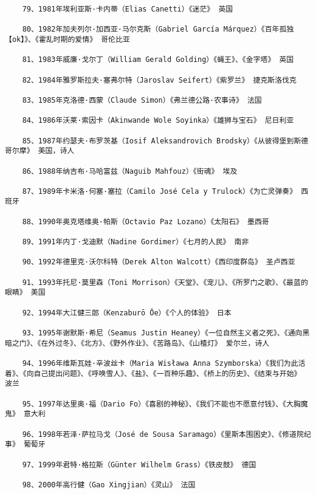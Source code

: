 \documentclass[UTF8]{../RepresentationUniverse}
\begin{document}
\begin{lstlisting}
    79、1981年埃利亚斯·卡内蒂（Elias Canetti）《迷茫》 英国
    
    80、1982年加夫列尔·加西亚·马尔克斯（Gabriel García Márquez）《百年孤独【ok】》、《霍乱时期的爱情》 哥伦比亚
    
    81、1983年威廉·戈尔丁（William Gerald Golding）《蝇王》、《金字塔》 英国
    
    82、1984年雅罗斯拉夫·塞弗尔特（Jaroslav Seifert）《紫罗兰》 捷克斯洛伐克
    
    83、1985年克洛德·西蒙（Claude Simon）《弗兰德公路·农事诗》 法国
    
    84、1986年沃莱·索因卡（Akinwande Wole Soyinka）《雄狮与宝石》 尼日利亚
    
    85、1987年约瑟夫·布罗茨基（Iosif Aleksandrovich Brodsky）《从彼得堡到斯德哥尔摩》 美国，诗人
    
    86、1988年纳吉布·马哈富兹（Naguib Mahfouz）《街魂》 埃及
    
    87、1989年卡米洛·何塞·塞拉（Camilo José Cela y Trulock）《为亡灵弹奏》 西班牙
    
    88、1990年奥克塔维奥·帕斯（Octavio Paz Lozano）《太阳石》 墨西哥
    
    89、1991年内丁·戈迪默（Nadine Gordimer）《七月的人民》 南非
    
    90、1992年德里克·沃尔科特（Derek Alton Walcott）《西印度群岛》 圣卢西亚
    
    91、1993年托尼·莫里森（Toni Morrison）《天堂》、《宠儿》、《所罗门之歌》、《最蓝的眼睛》 美国
    
    92、1994年大江健三郎（Kenzaburō Ōe）《个人的体验》 日本
    
    93、1995年谢默斯·希尼（Seamus Justin Heaney）《一位自然主义者之死》、《通向黑暗之门》、《在外过冬》、《北方》、《野外作业》、《苦路岛》、《山楂灯》 爱尔兰，诗人
    
    94、1996年维斯瓦娃·辛波丝卡（Maria Wisława Anna Szymborska）《我们为此活着》、《向自己提出问题》、《呼唤雪人》、《盐》、《一百种乐趣》、《桥上的历史》、《结束与开始》 波兰
    
    95、1997年达里奥·福（Dario Fo）《喜剧的神秘》、《我们不能也不愿意付钱》、《大胸魔鬼》 意大利
    
    96、1998年若泽·萨拉马戈（José de Sousa Saramago）《里斯本围困史》、《修道院纪事》 葡萄牙
    
    97、1999年君特·格拉斯（Günter Wilhelm Grass）《铁皮鼓》 德国
    
    98、2000年高行健（Gao Xingjian）《灵山》 法国
    

\end{lstlisting}
\end{document}
